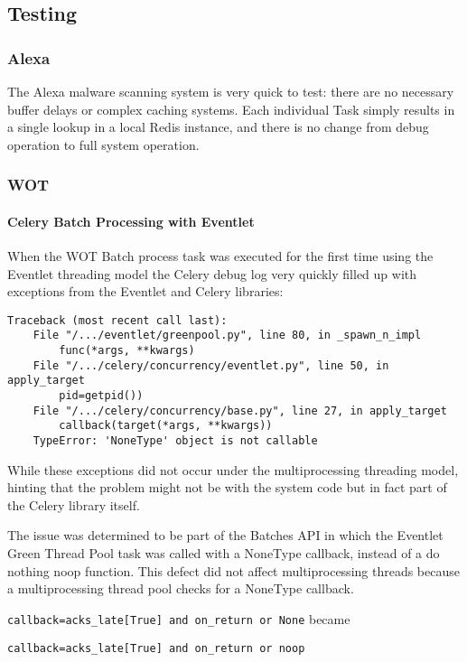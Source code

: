 \subsection{Testing}
\subsubsection{Alexa}
The Alexa malware scanning system is very quick to test: there are no necessary buffer delays or complex caching systems. Each individual Task simply results in a single lookup in a local Redis instance, and there is no change from debug operation to full system operation.

\subsubsection{WOT}
\paragraph{Celery Batch Processing with Eventlet}
When the WOT Batch process task was executed for the first time using the Eventlet threading model the Celery debug log very quickly filled up with exceptions from the Eventlet and Celery libraries:

\begin{verbatim}
Traceback (most recent call last):
    File "/.../eventlet/greenpool.py", line 80, in _spawn_n_impl
        func(*args, **kwargs)
    File "/.../celery/concurrency/eventlet.py", line 50, in apply_target
        pid=getpid())
    File "/.../celery/concurrency/base.py", line 27, in apply_target
        callback(target(*args, **kwargs))
    TypeError: 'NoneType' object is not callable
\end{verbatim}

While these exceptions did not occur under the multiprocessing threading model, hinting that the problem might not be with the system code but in fact part of the Celery library itself.

The issue was determined to be part of the Batches API in which the Eventlet Green Thread Pool task was called with a NoneType callback, instead of a do nothing noop function.  This defect did not affect multiprocessing threads because a multiprocessing thread pool checks for a NoneType callback.

\verb`callback=acks_late[True] and on_return or None` became

\verb`callback=acks_late[True] and on_return or noop`


